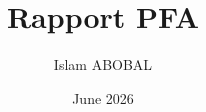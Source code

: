 

\newcommand{\monStyleTableau}{
  \rowcolors{2}{bleuTresClair}{white} 
}



\title{Rapport PFA}
\author{Islam ABOBAL}
\date{June 2026}

\usepackage{xcolor}
\usepackage[skins]{tcolorbox}


\usepackage{booktabs}
\usepackage{tabularx}
\usepackage{array}
\usepackage{multirow}
\usepackage{longtable}
\usepackage{xcolor}
\usepackage{colortbl}

